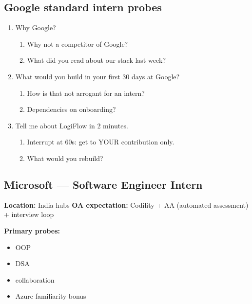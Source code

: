 \documentclass[9pt,a4paper]{article}
\begin{document}
\subsection{Google standard intern probes}
\begin{enumerate}[label=\textbf{Q\arabic*:}, leftmargin=*]
  \item Why Google?
  \begin{enumerate}[label=\textit{FU\arabic*:}, leftmargin=2em]
    \item Why not a competitor of Google?
    \item What did you read about our stack last week?
  \end{enumerate}
  \item What would you build in your first 30 days at Google?
  \begin{enumerate}[label=\textit{FU\arabic*:}, leftmargin=2em]
    \item How is that not arrogant for an intern?
    \item Dependencies on onboarding?
  \end{enumerate}
  \item Tell me about LogiFlow in 2 minutes.
  \begin{enumerate}[label=\textit{FU\arabic*:}, leftmargin=2em]
    \item Interrupt at 60s: get to YOUR contribution only.
    \item What would you rebuild?
  \end{enumerate}
\end{enumerate}
\newpage
\subsection{Microsoft --- Software Engineer Intern}
\textbf{Location:} India hubs \quad \textbf{OA expectation:} Codility + AA (automated assessment) + interview loop

\textbf{Primary probes:}
\begin{itemize}
  \item OOP
  \item DSA
  \item collaboration
  \item Azure familiarity bonus
\end{itemize}
\end{document}
